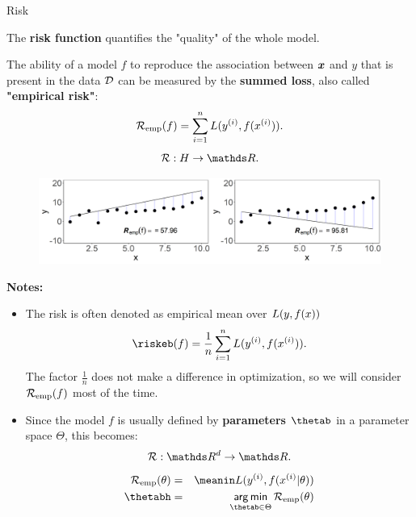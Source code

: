 \documentclass[11pt,compress,t,notes=noshow, xcolor=table]{beamer}
\begin{document}
\begin{vbframe}{Risk}

The \textbf{risk function} quantifies the "quality" of the whole model. 

\lz

The ability of a model $f$ to reproduce the association between $\bm{x}$ and $y$ that is present in the data $\mathcal{D}$ can be measured by the \textbf{summed loss}, also called \textbf{"empirical risk"}: \\

  $$
  \mathcal{R}_{\text{emp}}(f) = \sum_{i=1}^n L(y^{(i)}, f(x^{(i)})).
  $$
  $$
  \risk:  \Hspace \to \R.
  $$  
        

\vfill

\begin{center}
\begin{figure}[!b]
\includegraphics[width=1\textwidth]{figure/ml-basic_riskmin-2-risk.png}
\end{figure}
\end{center}

\framebreak 
   
\textbf{Notes:}
\begin{itemize}
\item The risk is often denoted as empirical mean over $L(y, f(x))$
  $$
    \riskeb(f) = \frac{1}{n}\sumin \Lxyi. 
  $$
  The factor $\frac{1}{n}$ does not make a difference in optimization, so we will consider $\mathcal{R}_{\text{emp}}(f)$ most of the time.  
\item Since the model $f$ is usually defined by \textbf{parameters} $\thetab$ in a parameter space $\Theta$, this becomes:
$$\risk : \R^d \to \R.$$
\begin{eqnarray*}
\risket & = & \meanin \Lxyit \cr
\thetabh & = & \argmin_{\thetab \in \Theta} \risket
\end{eqnarray*}
 

\end{itemize}
   
   
\end{vbframe}
\end{document}
